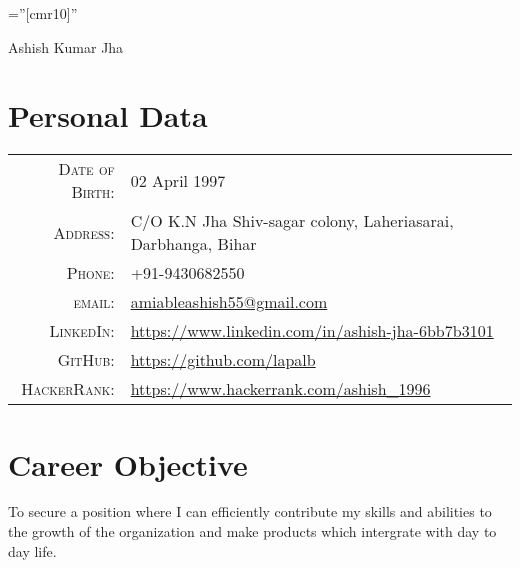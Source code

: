 \documentclass[a4paper,10pt]{article}
\begin{document}
\pagestyle{empty} %
\font\fb=''[cmr10]'' %

\par{
\centering
{\Huge Ashish Kumar Jha}
\bigskip
\par}

\section{Personal Data}

\begin{tabular}{rl}
    \textsc{Date of Birth:} & 02 April 1997 \\
    \textsc{Address:}   & C/O K.N Jha Shiv-sagar colony, Laheriasarai, Darbhanga, Bihar \\
    \textsc{Phone:}     & +91-9430682550\\
    \textsc{email:}     & \href{mailto:e-mail id}{amiableashish55@gmail.com}\\
    \textsc{LinkedIn:}&\url{https://www.linkedin.com/in/ashish-jha-6bb7b3101}\\
    \textsc{GitHub:}&\url{https://github.com/lapalb}\\
    \textsc{HackerRank:}&\url{https://www.hackerrank.com/ashish\_1996}
    
    
\end{tabular}

\section{Career Objective}

\footnotesize{To secure a position where I can efficiently contribute my skills and abilities to the growth of the organization and make products which intergrate with day to day life.}



\end{document}
